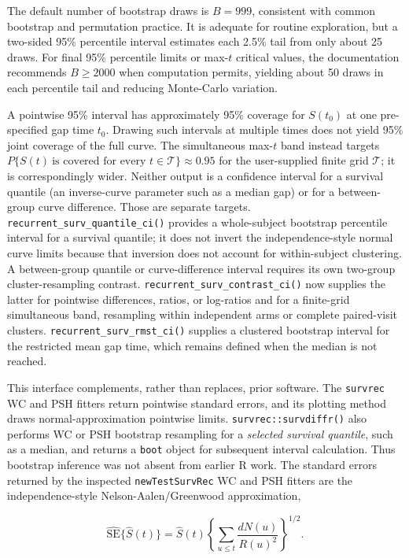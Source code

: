 \documentclass[
  12pt]{article}
\begin{document}
The default number of bootstrap draws is \(B=999\), consistent with
common bootstrap and permutation practice. It is adequate for routine
exploration, but a two-sided 95\% percentile interval estimates each
2.5\% tail from only about 25 draws. For final 95\% percentile limits or
max-\(t\) critical values, the documentation recommends \(B\geq 2000\)
when computation permits, yielding about 50 draws in each percentile
tail and reducing Monte-Carlo variation.

A pointwise 95\% interval has approximately 95\% coverage for \(S(t_0)\)
at one pre-specified gap time \(t_0\). Drawing such intervals at
multiple times does not yield 95\% joint coverage of the full curve. The
simultaneous max-\(t\) band instead targets
\(P\{S(t)\ \text{is covered for every }t\in\mathcal T\}\approx 0.95\)
for the user-supplied finite grid \(\mathcal T\); it is correspondingly
wider. Neither output is a confidence interval for a survival quantile
(an inverse-curve parameter such as a median gap) or for a between-group
curve difference. Those are separate targets.
\texttt{recurrent\_surv\_quantile\_ci()} provides a whole-subject
bootstrap percentile interval for a survival quantile; it does not
invert the independence-style normal curve limits because that inversion
does not account for within-subject clustering. A between-group quantile
or curve-difference interval requires its own two-group
cluster-resampling contrast. \texttt{recurrent\_surv\_contrast\_ci()}
now supplies the latter for pointwise differences, ratios, or log-ratios
and for a finite-grid simultaneous band, resampling within independent
arms or complete paired-visit clusters.
\texttt{recurrent\_surv\_rmst\_ci()} supplies a clustered bootstrap
interval for the restricted mean gap time, which remains defined when
the median is not reached.

This interface complements, rather than replaces, prior software. The
\texttt{survrec} WC and PSH fitters return pointwise standard errors,
and its plotting method draws normal-approximation pointwise limits.
\texttt{survrec::survdiffr()} also performs WC or PSH bootstrap
resampling for a \emph{selected survival quantile}, such as a median,
and returns a \texttt{boot} object for subsequent interval calculation.
Thus bootstrap inference was not absent from earlier R work. The
standard errors returned by the inspected \texttt{newTestSurvRec} WC and
PSH fitters are the independence-style Nelson-Aalen/Greenwood
approximation,

\[
\widehat{\mathrm{SE}}\{\widehat S(t)\}=
\widehat S(t)\left\{\sum_{u\leq t}\frac{dN(u)}{R(u)^2}\right\}^{1/2}.
\]
\end{document}
